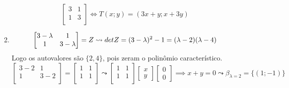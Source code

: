 \documentclass[english,ngerman,parskip=half]{scrartcl}
\begin{document}
\begin{enumerate}
\begin{enumerate}
\begin{equation}
\begin{bmatrix}
                        3&1 \\
                        1&3 \\
                    \end{bmatrix}
                    \iff T(x;y) = (3x+y ; x+3y)
                \end{equation}
            \item
                \begin{equation}
                    \begin{bmatrix}
                        3 - \lambda & 1 \\
                        1 & 3 - \lambda \\
                    \end{bmatrix}
                    = Z \leadsto \\
                    det Z = (3 - \lambda)^2 -1 = (\lambda -2)(\lambda -4)
                \end{equation}
                Logo os autovalores são $\{2, 4\}$, pois zeram o polinômio característico.
                \begin{equation}
                    \begin{bmatrix}
                        3 - 2 & 1 \\
                        1 & 3 - 2 \\
                    \end{bmatrix}
                    =
                    \begin{bmatrix}
                        1 & 1 \\
                        1 & 1 \\
                    \end{bmatrix}
                    \leadsto 
                    \begin{bmatrix}
                        1 & 1 \\
                        1 & 1 \\
                    \end{bmatrix}
                    \begin{bmatrix}
                        x \\
                        y
                    \end{bmatrix}
                    \begin{bmatrix}
                        0 \\
                        0
                    \end{bmatrix}
                    \implies x + y = 0 \leadsto \beta_{\lambda=2} = \{(1;-1)\}
                \end{equation}


\end{enumerate}
\end{enumerate}
\end{document}
